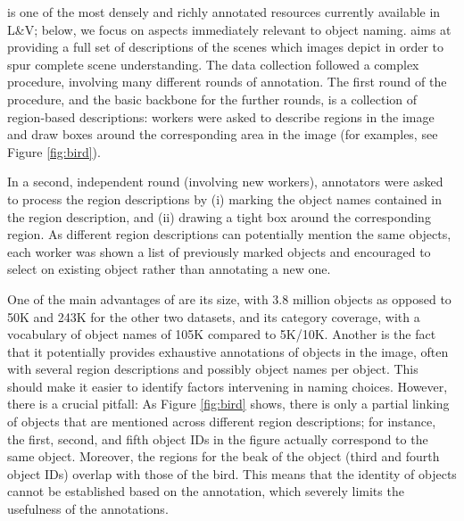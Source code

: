 \vg \cite{krishna2016visualgenome} is one of the most densely and richly annotated resources currently available in L\&V; below, we focus on aspects immediately relevant to object naming.
\vg aims at providing a full set of descriptions of the scenes which images depict in order to spur complete scene understanding. 
The data collection followed a complex procedure, involving many different rounds of annotation.
The first round of the procedure, and the basic backbone for the further rounds, is a collection of region-based descriptions: workers were asked to describe regions in the image and draw boxes around the corresponding area in the image (for examples, see Figure \ref{fig:bird}).

In a second, independent round (involving new workers), annotators were asked to process the region descriptions by (i) marking the object names contained in the region description, and (ii) drawing a tight box around the corresponding region. As different region descriptions can potentially mention the same objects, each worker was shown a list of previously marked objects and encouraged to select on existing object rather than annotating a new one.

One of the main advantages of \vg are its size, with 3.8 million objects as opposed to 50K and 243K for the other two datasets, and its category coverage, with a vocabulary of object names of 105K compared to 5K/10K.
Another is the fact that it potentially provides exhaustive annotations of objects in the image, often with several region descriptions and possibly object names per object.
This should make it easier to identify factors intervening in naming choices.
However, there is a crucial pitfall: As Figure \ref{fig:bird} shows, there is only a partial linking of objects that are mentioned across different region descriptions; for instance, the first, second, and fifth object IDs in the figure actually correspond to the same object.
Moreover, the regions for the beak of the object (third and fourth object IDs) overlap with those of the bird.
This means that the identity of objects cannot be established based on the annotation, which severely limits the usefulness of the annotations.

